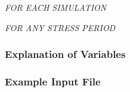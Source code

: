 \noindent \textit{FOR EACH SIMULATION}

\vspace{5mm}
\noindent \textit{FOR ANY STRESS PERIOD}


\vspace{5mm}
\subsubsection{Explanation of Variables}
\begin{description}

\end{description}

\vspace{5mm}
\subsubsection{Example Input File}

